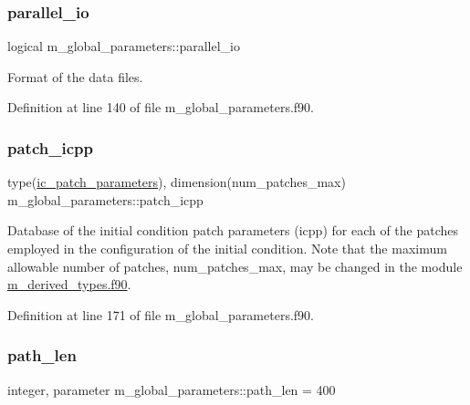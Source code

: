 \subsubsection{\texorpdfstring{parallel\+\_\+io}{parallel\_io}}
{\footnotesize\ttfamily logical m\+\_\+global\+\_\+parameters\+::parallel\+\_\+io}



Format of the data files. 



Definition at line 140 of file m\+\_\+global\+\_\+parameters.\+f90.

\mbox{\label{namespacem__global__parameters_ab5fc97fce88eefa124865cab08aa2250}} 
\subsubsection{\texorpdfstring{patch\+\_\+icpp}{patch\_icpp}}
{\footnotesize\ttfamily type(\hyperlink{structm__derived__types_1_1ic__patch__parameters}{ic\+\_\+patch\+\_\+parameters}), dimension(num\+\_\+patches\+\_\+max) m\+\_\+global\+\_\+parameters\+::patch\+\_\+icpp}



Database of the initial condition patch parameters (icpp) for each of the patches employed in the configuration of the initial condition. Note that the maximum allowable number of patches, num\+\_\+patches\+\_\+max, may be changed in the module \hyperlink{m__derived__types_8f90}{m\+\_\+derived\+\_\+types.\+f90}. 



Definition at line 171 of file m\+\_\+global\+\_\+parameters.\+f90.

\mbox{\label{namespacem__global__parameters_aa9d578c318044b2f2ec990b5fc0dfab9}} 
\subsubsection{\texorpdfstring{path\+\_\+len}{path\_len}}
{\footnotesize\ttfamily integer, parameter m\+\_\+global\+\_\+parameters\+::path\+\_\+len = 400}



